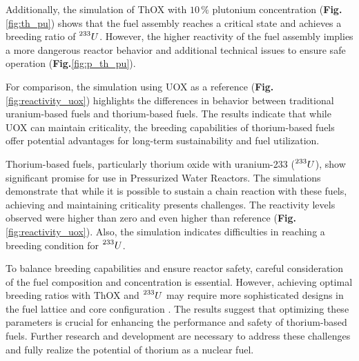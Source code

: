 Additionally, the simulation of ThOX with \(10 \, \%\) plutonium concentration (\textbf{Fig.}\ref{fig:th_pu}) shows that the fuel assembly reaches a critical state and achieves a breeding ratio of \(\prescript{233}{}{U}\). However, the higher reactivity of the fuel assembly implies a more dangerous reactor behavior and additional technical issues to ensure safe operation (\textbf{Fig.}\ref{fig:p_th_pu}).

For comparison, the simulation using UOX as a reference (\textbf{Fig.} \ref{fig:reactivity_uox}) highlights the differences in behavior between traditional uranium-based fuels and thorium-based fuels. The results indicate that while UOX can maintain criticality, the breeding capabilities of thorium-based fuels offer potential advantages for long-term sustainability and fuel utilization.

Thorium-based fuels, particularly thorium oxide with uranium-233 (\(\prescript{233}{}{U}\)), show significant promise for use in Pressurized Water Reactors. The simulations demonstrate that while it is possible to sustain a chain reaction with these fuels, achieving and maintaining criticality presents challenges. The reactivity levels observed were higher than zero and even higher than reference (\textbf{Fig.} \ref{fig:reactivity_uox}). Also, the simulation indicates difficulties in reaching a breeding condition for \(\prescript{233}{}{U}\).

\vspace{90pt}

To balance breeding capabilities and ensure reactor safety, careful consideration of the fuel composition and concentration is essential. However, achieving optimal breeding ratios with ThOX and \(\prescript{233}{}{U}\) may require more sophisticated designs in the fuel lattice and core configuration \cite{roadmap}. The results suggest that optimizing these parameters is crucial for enhancing the performance and safety of thorium-based fuels. Further research and development are necessary to address these challenges and fully realize the potential of thorium as a nuclear fuel.
